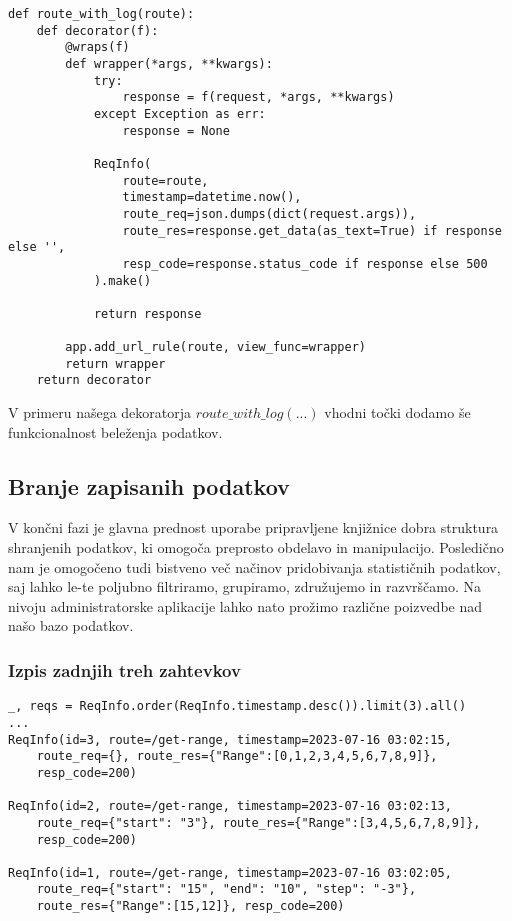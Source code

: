 \documentclass[a4paper,12pt,openright]{book}
\begin{document}
\begin{verbatim}
def route_with_log(route):
    def decorator(f):
        @wraps(f)
        def wrapper(*args, **kwargs):
            try:
                response = f(request, *args, **kwargs)
            except Exception as err:
                response = None

            ReqInfo(
                route=route,
                timestamp=datetime.now(),
                route_req=json.dumps(dict(request.args)),
                route_res=response.get_data(as_text=True) if response else '',
                resp_code=response.status_code if response else 500
            ).make()

            return response
        
        app.add_url_rule(route, view_func=wrapper)
        return wrapper
    return decorator
\end{verbatim}

    \noindent
    V primeru našega dekoratorja $route\_with\_log(...)$ vhodni točki dodamo še funkcionalnost beleženja podatkov.

    \subsection{Branje zapisanih podatkov}

    V končni fazi je glavna prednost uporabe pripravljene knjižnice dobra struktura shranjenih podatkov, ki omogoča preprosto obdelavo in manipulacijo. Posledično nam je omogočeno tudi bistveno več načinov pridobivanja statističnih podatkov, saj lahko le-te poljubno filtriramo, grupiramo, združujemo in razvrščamo. Na nivoju administratorske aplikacije lahko nato prožimo različne poizvedbe nad našo bazo podatkov.

    \subsubsection{Izpis zadnjih treh zahtevkov}

\begin{verbatim}
_, reqs = ReqInfo.order(ReqInfo.timestamp.desc()).limit(3).all()
... 
ReqInfo(id=3, route=/get-range, timestamp=2023-07-16 03:02:15, 
    route_req={}, route_res={"Range":[0,1,2,3,4,5,6,7,8,9]},
    resp_code=200)
    
ReqInfo(id=2, route=/get-range, timestamp=2023-07-16 03:02:13, 
    route_req={"start": "3"}, route_res={"Range":[3,4,5,6,7,8,9]},
    resp_code=200)
    
ReqInfo(id=1, route=/get-range, timestamp=2023-07-16 03:02:05,
    route_req={"start": "15", "end": "10", "step": "-3"},
    route_res={"Range":[15,12]}, resp_code=200)
\end{verbatim}
\end{document}
